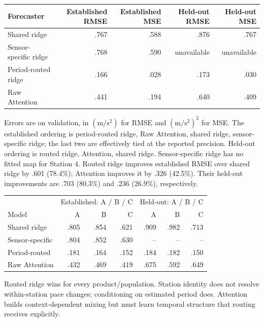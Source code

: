 \documentclass[10pt,a4paper]{article}
\begin{document}
\begin{center}\small
\begin{tabular}{lrrrr}\toprule
Forecaster & Established RMSE & Established MSE & Held-out RMSE & Held-out MSE\\\midrule
Shared ridge & .767 & .588 & .876 & .767\\
Sensor-specific ridge & .768 & .590 & unavailable & unavailable\\
Period-routed ridge & .166 & .028 & .173 & .030\\
Raw Attention & .441 & .194 & .640 & .409\\\bottomrule
\end{tabular}\end{center}
Errors are on validation, in $(\mathrm{m/s^2})$ for RMSE and $(\mathrm{m/s^2})^2$ for MSE. The established ordering is period-routed ridge, Raw Attention, shared ridge, sensor-specific ridge; the last two are effectively tied at the reported precision. Held-out ordering is routed ridge, Attention, shared ridge. Sensor-specific ridge has no fitted map for Station 4. Routed ridge improves established RMSE over shared ridge by .601 (78.4\%); Attention improves it by .326 (42.5\%). Their held-out improvements are .703 (80.3\%) and .236 (26.9\%), respectively.

\begin{center}\small
\begin{tabular}{lrrr|rrr}\toprule
 & \multicolumn{3}{c}{Established: A / B / C} & \multicolumn{3}{c}{Held-out: A / B / C}\\
Model & A & B & C & A & B & C\\\midrule
Shared ridge & .805 & .854 & .621 & .909 & .982 & .713\\
Sensor-specific & .804 & .852 & .630 & -- & -- & --\\
Period-routed & .181 & .164 & .152 & .184 & .182 & .150\\
Raw Attention & .432 & .469 & .419 & .675 & .592 & .649\\\bottomrule
\end{tabular}\end{center}
Routed ridge wins for every product/population. Station identity does not resolve within-station pace changes; conditioning on estimated period does. Attention builds context-dependent mixing but must learn temporal structure that routing receives explicitly.
\end{document}
